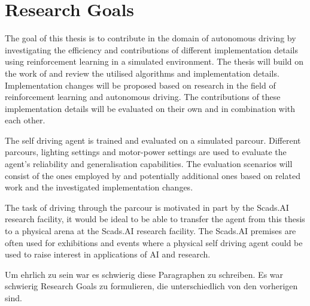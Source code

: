 


\chapter{Research Goals}
\label{cha:Research Goals}

The goal of this thesis is to contribute in the domain of autonomous driving by investigating the efficiency and contributions of different implementation details using reinforcement learning in a simulated environment. The thesis will build on the work of \autocite{maximilian} and review the utilised algorithms and implementation details. Implementation changes will be proposed based on research in the field of reinforcement learning and autonomous driving. The contributions of these implementation details will be evaluated on their own and in combination with each other. 

The self driving agent is trained and evaluated on a simulated parcour. Different parcours, lighting settings and motor-power settings are used to evaluate the agent's reliability and generalisation capabilities. The evaluation scenarios will consist of the ones employed by \autocite{maximilian} and potentially additional ones based on related work and the investigated implementation changes.

The task of driving through the parcour is motivated in part by the Scads.AI research facility, it would be ideal to be able to transfer the agent from this thesis to a physical arena at the Scads.AI research facility. The Scads.AI premises are often used for exhibitions and events where a physical self driving agent could be used to raise interest in applications of AI and research. %


Um ehrlich zu sein war es schwierig diese Paragraphen zu schreiben. Es war schwierig Research Goals zu formulieren, die unterschiedlich von den vorherigen sind.

